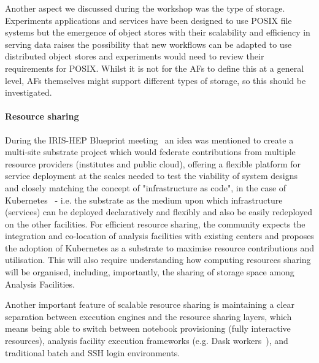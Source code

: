 \documentclass[a4paper,11pt]{article}
\begin{document}
Another aspect we discussed during the workshop was the type of storage.
Experiments applications and services have been designed to use POSIX
file systems but the emergence of object stores with their scalability
and efficiency in serving data raises the possibility that new workflows
can be adapted to use distributed object stores and experiments would
need to review their requirements for POSIX. Whilst it is not for the
AFs to define this at a general level, AFs themselves might support different types of
storage, so this should be investigated.


\hypertarget{resource-sharing}{%
\paragraph{Resource sharing}\label{resource-sharing}}

During the IRIS-HEP
Blueprint meeting~\cite{IRISHEPblueprint} an idea was mentioned to create a multi-site
substrate project which would federate contributions from multiple
resource providers (institutes and public cloud), offering a flexible
platform for service deployment at the scales needed to test the
viability of system designs and closely matching the concept of
"infrastructure as code", in the case of Kubernetes~\cite{k8s} - i.e. the substrate as
the medium upon which infrastructure (services) can be deployed
declaratively and flexibly and also be easily redeployed on the other
facilities. For efficient resource sharing, the community expects the
integration and co-location of analysis facilities with existing centers
and proposes the adoption of Kubernetes as a substrate to maximise
resource contributions and utilisation. This will also require
understanding how computing resources sharing will be organised,
including, importantly, the sharing of storage space among Analysis
Facilities.

Another important feature of scalable resource sharing is maintaining a
clear separation between execution engines and the resource sharing
layers, which means being able to switch between notebook provisioning
(fully interactive resources), analysis facility execution frameworks
(e.g. Dask workers~\cite{dask}), and traditional batch and SSH login environments.
\end{document}
